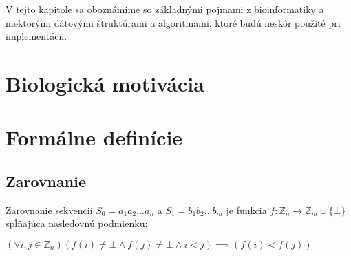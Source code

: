 V tejto kapitole sa oboznámime so základnými pojmami z bioinformatiky a
niektorými dátovými štruktúrami a algoritmami, ktoré budú neskôr použité pri
implementácii.

\section{Biologická motivácia}
\todo{}

\section{Formálne definície}

    \subsection{Zarovnanie}
    \begin{defn}
        Zarovnanie sekvencií $S_0 = a_1 a_2 \ldots a_n$ a $S_1 = b_1 b_2 \ldots
        b_m$ je funkcia $f : \mathbb{Z}_n \to \mathbb{Z}_m \cup \{ \bot \} $
        spĺňajúca nasledovnú podmienku:
        
        $ (\forall i, j \in \mathbb{Z}_n) (f(i) \neq \bot \wedge f(j) \neq \bot
        \wedge i < j) \implies (f(i) < f(j)) $
    \end{defn}
    
    \bigskip
    
